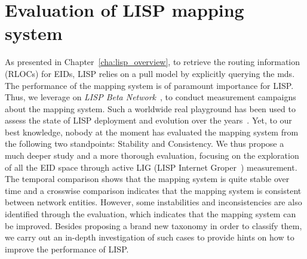 
\chapter{Evaluation of LISP mapping system}
\label{cha:mds_evaluation}

\ifpdf
    \graphicspath{{Chapter4/Pics/Raster/}{Chapter4/Pics/PDF/}{Chapter4/}}
\else
    \graphicspath{{Chapter4/Pics/Vector/}{Chapter4/}}
\fi




As presented in Chapter~\ref{cha:lisp_overview}, to retrieve the routing information (RLOCs) for EIDs, LISP relies on a pull model by explicitly querying the \acrfull{mds}. The performance of the mapping system is of paramount importance for LISP. Thus, we leverage on \emph{LISP Beta Network}~\cite{lispbeta}, to conduct measurement campaigns about the mapping system. Such a worldwide real playground has been used to assess the state of LISP deployment and evolution over the years~\cite{lispCCR}. Yet, to our best knowledge, nobody at the moment has evaluated the mapping system from the following two standpoints: Stability and Consistency. We thus propose a much deeper study and a more thorough evaluation, focusing on the exploration of all the EID space through active LIG (LISP Internet Groper~\cite{rfc6835}) measurement. The temporal comparison shows that the mapping system is quite stable over time and a crosswise comparison indicates that the mapping system is consistent between network entities. However, some instabilities and inconsistencies are also identified through the evaluation, which indicates that the mapping system can be improved. Besides proposing a brand new taxonomy in order to classify them, we carry out an in-depth investigation of such cases to provide hints on how to improve the performance of LISP.

